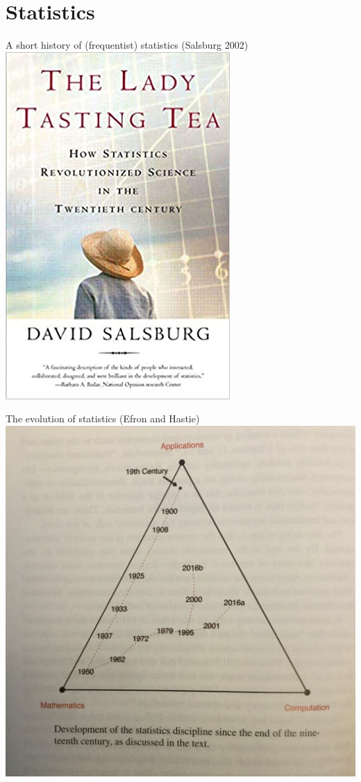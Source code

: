 \documentclass[
  ignorenonframetext,
  aspectratio=54,
]{beamer}
\begin{document}
\hypertarget{statistics}{%
\section{Statistics}\label{statistics}}

\begin{frame}{A short history of (frequentist) statistics (Salsburg
2002)}
\protect\hypertarget{a-short-history-of-frequentist-statistics-salsburg-2002}{}
\includegraphics{exhibit/lady-tasting-tea.jpg}
\end{frame}

\begin{frame}{The evolution of statistics (Efron and Hastie)}
\protect\hypertarget{the-evolution-of-statistics-efron-and-hastie}{}
\includegraphics{exhibit/efron-hastie.jpg}
\end{frame}
\end{document}
